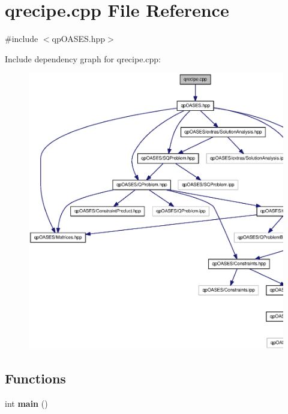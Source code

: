 \section{qrecipe.cpp File Reference}
\label{qrecipe_8cpp}
{\ttfamily \#include $<$qpOASES.hpp$>$}\par
Include dependency graph for qrecipe.cpp:
\nopagebreak
\begin{figure}[H]
\begin{center}
\leavevmode
\includegraphics[width=400pt]{qrecipe_8cpp__incl}
\end{center}
\end{figure}
\subsection*{Functions}
\begin{DoxyCompactItemize}
\item 
int {\bf main} ()
\end{DoxyCompactItemize}
